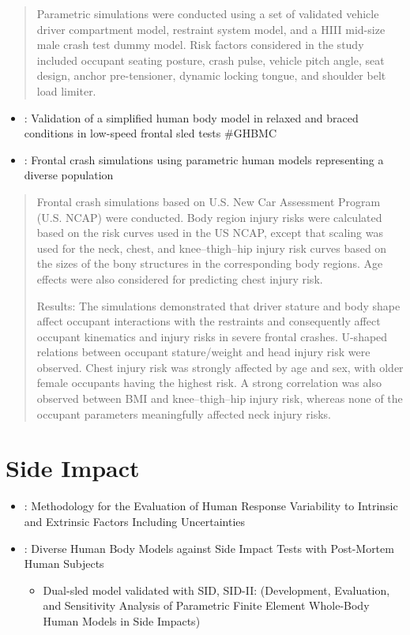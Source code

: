 \documentclass[]{book}
\providecommand{\tightlist}{%
  \setlength{\itemsep}{0pt}\setlength{\parskip}{0pt}}
\begin{document}
\begin{quote}
Parametric simulations were conducted using a set of validated vehicle driver compartment model, restraint system model, and a HIII mid-size male crash test dummy model. Risk factors considered in the study included occupant seating posture, crash pulse, vehicle pitch angle, seat design, anchor pre-tensioner, dynamic locking tongue, and shoulder belt load limiter.
\end{quote}

\begin{itemize}
\item
  \citet{Devane2019}: Validation of a simplified human body model in relaxed and braced conditions in low-speed frontal sled tests \#GHBMC
\item
  \citet{Hu2019}: Frontal crash simulations using parametric human models representing a diverse population
\end{itemize}

\begin{quote}
Frontal crash simulations based on U.S. New Car Assessment Program (U.S. NCAP) were conducted. Body region injury risks were calculated based on the risk curves used in the US NCAP, except that scaling was used for the neck, chest, and knee--thigh--hip injury risk curves based on the sizes of the bony structures in the corresponding body regions. Age effects were also considered for predicting chest injury risk.

Results: The simulations demonstrated that driver stature and body shape affect occupant interactions with the restraints and consequently affect occupant kinematics and injury risks in severe frontal crashes. U-shaped relations between occupant stature/weight and head injury risk were observed. Chest injury risk was strongly affected by age and sex, with older female occupants having the highest risk. A strong correlation was also observed between BMI and knee--thigh--hip injury risk, whereas none of the occupant parameters meaningfully affected neck injury risks.
\end{quote}

\hypertarget{side-impact}{%
\section{Side Impact}\label{side-impact}}

\begin{itemize}
\item
  \citet{PerezRapela2020}: Methodology for the Evaluation of Human Response Variability to Intrinsic and Extrinsic Factors Including Uncertainties
\item
  \citet{Hwang2019}: Diverse Human Body Models against Side Impact Tests with Post-Mortem Human Subjects

  \begin{itemize}
  \tightlist
  \item
    Dual-sled model validated with SID, SID-II: \citet{Hwang2016} (Development, Evaluation, and Sensitivity Analysis of Parametric Finite Element Whole-Body Human Models in Side Impacts)
  \end{itemize}
\end{itemize}
\end{document}
